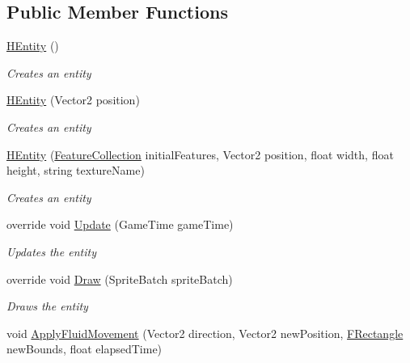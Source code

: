 \subsection*{Public Member Functions}
\begin{DoxyCompactItemize}
\item 
\hyperlink{class_hel_project_1_1_game_world_1_1_entities_1_1_h_entity_a0f76dfa203f3b1802a15d809b4c33170}{H\+Entity} ()
\begin{DoxyCompactList}\small\item\em Creates an entity \end{DoxyCompactList}\item 
\hyperlink{class_hel_project_1_1_game_world_1_1_entities_1_1_h_entity_af078f47455d53ed5785b07a41fbec28a}{H\+Entity} (Vector2 position)
\begin{DoxyCompactList}\small\item\em Creates an entity \end{DoxyCompactList}\item 
\hyperlink{class_hel_project_1_1_game_world_1_1_entities_1_1_h_entity_a1d40c7e2b78f21e2866e8339221a537d}{H\+Entity} (\hyperlink{class_hel_project_1_1_features_1_1_feature_collection}{Feature\+Collection} initial\+Features, Vector2 position, float width, float height, string texture\+Name)
\begin{DoxyCompactList}\small\item\em Creates an entity \end{DoxyCompactList}\item 
override void \hyperlink{class_hel_project_1_1_game_world_1_1_entities_1_1_h_entity_a3feda059e3ebd1a20579260a6dc60291}{Update} (Game\+Time game\+Time)
\begin{DoxyCompactList}\small\item\em Updates the entity \end{DoxyCompactList}\item 
override void \hyperlink{class_hel_project_1_1_game_world_1_1_entities_1_1_h_entity_aac4efdcaa42e096838556aba9345f8d5}{Draw} (Sprite\+Batch sprite\+Batch)
\begin{DoxyCompactList}\small\item\em Draws the entity \end{DoxyCompactList}\item 
void \hyperlink{class_hel_project_1_1_game_world_1_1_entities_1_1_h_entity_a69383bd603d893820aaa8ce83dbde7c8}{Apply\+Fluid\+Movement} (Vector2 direction, Vector2 new\+Position, \hyperlink{class_hel_project_1_1_tools_1_1_f_rectangle}{F\+Rectangle} new\+Bounds, float elapsed\+Time)

\end{DoxyCompactItemize}
